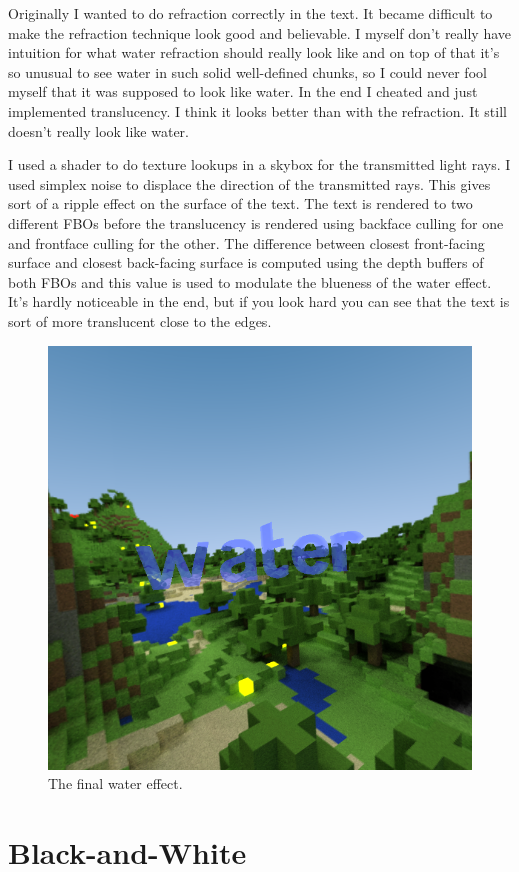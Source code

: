 \documentclass{acmsiggraph}               %
\begin{document}
Originally I wanted to do refraction correctly in the text. It became difficult
to make the refraction technique look good and believable.  I myself don't
really have intuition for what water refraction should really look like and
on top of that it's so unusual to see water in such solid well-defined chunks,
so I could never fool myself that it was supposed to look like water.
In the end I cheated and just implemented translucency. I think it looks better
than with the refraction. It still doesn't really look like water.

I used a shader to do texture lookups in a skybox for the transmitted light
rays. I used simplex noise to displace the direction of the transmitted rays.
This gives sort of a ripple effect on the surface of the text. The text is
rendered to two different FBOs before the translucency is rendered using
backface culling for one and frontface culling for the other. The difference
between closest front-facing surface and closest back-facing surface is
computed using the depth buffers of both FBOs and this value is used to
modulate the blueness of the water effect.  It's hardly noticeable in the end,
but if you look hard you can see that the text is sort of more translucent
close to the edges.

\begin{figure}[H]
    \centering
    \includegraphics[width=0.7\columnwidth]{water.png}
    \caption{The final water effect.}
\end{figure}

\section{Black-and-White}
\end{document}
